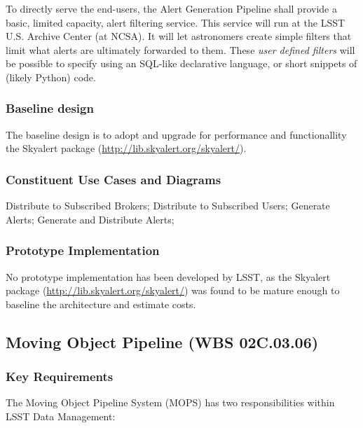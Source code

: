 \documentclass[12pt]{article}
\newcommand{\wbsMOPS}{WBS 02C.03.06}
\begin{document}
To directly serve the end-users, the Alert Generation Pipeline shall provide a basic, limited capacity, alert filtering service. This service will run at the LSST U.S. Archive Center (at NCSA). It will let astronomers create simple filters that limit what alerts are ultimately forwarded to them. These {\em user defined filters} will be possible to specify using an SQL-like declarative language, or short snippets of (likely Python) code.

\subsubsection{Baseline design}

The baseline design is to adopt and upgrade for performance and functionallity the Skyalert package (\url{http://lib.skyalert.org/skyalert/}).

\subsubsection{Constituent Use Cases and Diagrams}

Distribute to Subscribed Brokers;
Distribute to Subscribed Users;
Generate Alerts;
Generate and Distribute Alerts;

\subsubsection{Prototype Implementation}

No prototype implementation has been developed by LSST, as the Skyalert package (\url{http://lib.skyalert.org/skyalert/}) was found to be mature enough to baseline the architecture and estimate costs.

\clearpage

\subsection{Moving Object Pipeline (\wbsMOPS)}

\subsubsection{Key Requirements}

The Moving Object Pipeline System (MOPS) has two responsibilities within LSST Data Management:
\end{document}
